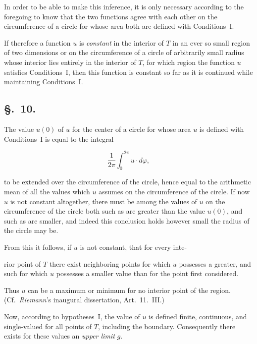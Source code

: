 \documentclass{article}
\begin{document}
In order to be able to make this inference, it is only necessary according to the foregoing to know that the two functions agree with each other on the circumference of a circle for whose area both are defined with Conditions~I.



If therefore a function $u$ is \emph{constant} in the interior of $T$ in an ever so small region of two dimensions or on the circumference of a circle of arbitrarily small radius whose interior lies entirely in the interior of $T$, for which region the function $u$ satisfies Conditions~I, then this function is constant so far as it is continued while maintaining Conditions~I.



\subsection*{§.~10.}



The value $u(0)$ of $u$ for the center of a circle for whose area $u$ is defined with Conditions~I is equal to the integral

\[

\frac{1}{2\pi} \int_0^{2\pi} u \cdot d\varphi,

\]

to be extended over the circumference of the circle, hence equal to the arithmetic mean of all the values which $u$ assumes on the circumference of the circle. If now $u$ is not constant altogether, there must be among the values of $u$ on the circumference of the circle both such as are greater than the value $u(0)$, and such as are smaller, and indeed this conclusion holds however small the radius of the circle may be.



From this it follows, if $u$ is not constant, that for every inte-




rior point of $T$ there exist neighboring points for which $u$ possesses a greater, and such for which $u$ possesses a smaller value than for the point first considered.



Thus $u$ can be a maximum or minimum for no interior point of the region. (Cf.~\emph{Riemann}'s inaugural dissertation, Art.~11.~III.)



Now, according to hypotheses~I, the value of $u$ is defined finite, continuous, and single-valued for all points of $T$, including the boundary. Consequently there exists for these values an \emph{upper limit} $g$.
\end{document}
